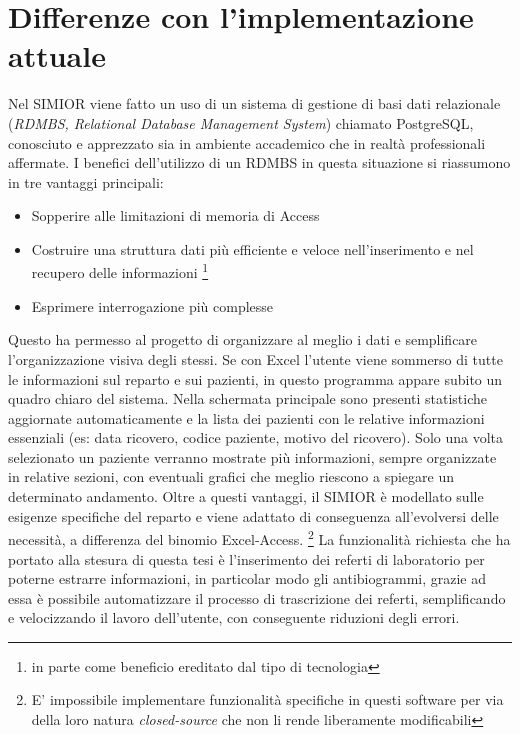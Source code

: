 \section{Differenze con l'implementazione attuale}
Nel SIMIOR viene fatto un uso di un sistema di gestione di basi dati relazionale (\textit{RDMBS, Relational Database Management System}) chiamato PostgreSQL, conosciuto e apprezzato sia in ambiente accademico che in realtà professionali affermate. I benefici dell'utilizzo di un RDMBS in questa situazione si riassumono in tre vantaggi principali:
\begin{itemize}
	\item Sopperire alle limitazioni di memoria di Access
	\item Costruire una struttura dati più efficiente e veloce nell'inserimento e nel recupero delle informazioni \footnote{in parte come beneficio ereditato dal tipo di tecnologia}
	\item Esprimere interrogazione più complesse
\end{itemize}
Questo ha permesso al progetto di organizzare al meglio i dati e semplificare l'organizzazione visiva degli stessi. 
Se con Excel l'utente viene sommerso di tutte le informazioni sul reparto e sui pazienti, in questo programma appare subito un quadro chiaro del sistema. Nella schermata principale sono presenti statistiche aggiornate automaticamente e la lista dei pazienti con le relative informazioni essenziali (es: data ricovero, codice paziente, motivo del ricovero). Solo una volta selezionato un paziente verranno mostrate più informazioni, sempre organizzate in relative sezioni, con eventuali grafici che meglio riescono a spiegare un determinato andamento.
Oltre a questi vantaggi, il SIMIOR è modellato sulle esigenze specifiche del reparto e viene adattato di conseguenza all'evolversi delle necessità, a differenza del binomio Excel-Access. \footnote{E' impossibile implementare funzionalità specifiche in questi software per via della loro natura \textit{closed-source} che non li rende liberamente modificabili}
La funzionalità richiesta che ha portato alla stesura di questa tesi è l'inserimento dei referti di laboratorio per poterne estrarre informazioni, in particolar modo gli antibiogrammi, grazie ad essa è possibile automatizzare il processo di trascrizione dei referti, semplificando e velocizzando il lavoro dell'utente, con conseguente riduzioni degli errori.



%
%


